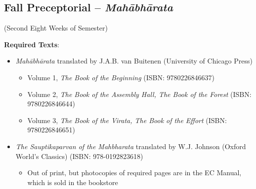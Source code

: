 \documentclass{article}
\newcounter{cntSemester} %
\begin{document}

\clearpage


\begin{center}
	\section[Fall Preceptorial 2]{Fall Preceptorial -- \emph{Mahābhārata}}
	 (Second Eight Weeks of Semester)
\end{center}

\textbf{Required Texts}:
\newcommand{\fallPreceptTwoReadingList}{%
	\begin{itemize}
		\item \textit{Mahābhārata} translated by J.A.B. van Buitenen (University of Chicago Press)
		      \begin{itemize}
			      \item Volume 1, \textit{The Book of the Beginning} (ISBN: 9780226846637)
			      \item Volume 2, \textit{The Book of the Assembly Hall, The Book of the Forest} (ISBN: 9780226846644)
			      \item Volume 3, \textit{The Book of the Virata, The Book of the Effort} (ISBN: 9780226846651)
		      \end{itemize}
		\item \textit{The Sauptikaparvan of the Mahbharata} translated by W.J. Johnson (Oxford World’s Classics) (ISBN: 978-0192823618)
		      \begin{itemize}
			      \item Out of print, but photocopies of required pages are in the EC Manual, which is sold in the bookstore
		      \end{itemize}
	\end{itemize}
}
\fallPreceptTwoReadingList%
\end{document}

